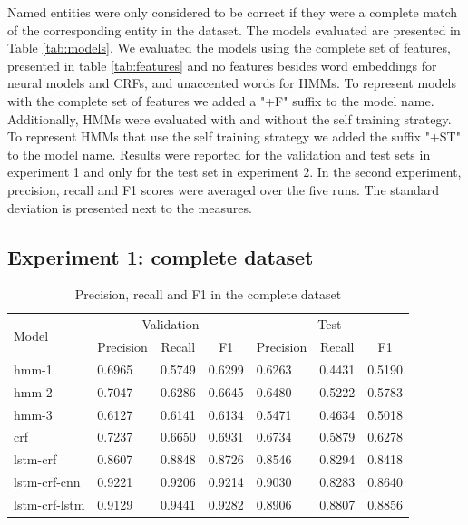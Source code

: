 \documentclass[sigconf]{acmart}
\begin{document}
Named entities were only considered to be correct if they were a complete match of the 
corresponding entity in the dataset. The models evaluated are presented in Table \ref{tab:models}.
We evaluated the models using the complete set of features, presented in 
table \ref{tab:features} and no features besides word embeddings for neural models and
CRFs, and unaccented words for HMMs. To represent models with the complete set of features
we added a "+F" suffix to the model name. Additionally, HMMs were evaluated with and
without the self training strategy. To represent HMMs that use the self training strategy
we added the suffix "+ST" to the model name.
Results were reported for the validation and test sets in experiment 1 and only for the
test set in experiment 2. In the second experiment, precision, recall and F1 scores were 
averaged over the five runs. The standard deviation is presented next to the measures.

\subsection{Experiment 1: complete dataset}

\begin{table}[h]
  \small
  \begin{center}
    \begin{tabular}{ |l|l|l|l|l|l|l| }
      \hline
      \multirow{2}{*}{Model} & \multicolumn{3}{c|}{Validation} & \multicolumn{3}{c|}{Test} \\
                             & \multicolumn{1}{c}{Precision} & \multicolumn{1}{c}{Recall} & \multicolumn{1}{c|}{F1}
                             & \multicolumn{1}{c}{Precision} & \multicolumn{1}{c}{Recall} & \multicolumn{1}{c|}{F1} \\
      \hline
      hmm-1	      & 0.6965 & 0.5749 & 0.6299 & 0.6263 & 0.4431 & 0.5190 \\
      hmm-2	      & 0.7047 & 0.6286 & 0.6645 & 0.6480 & 0.5222 & 0.5783 \\
      hmm-3	      & 0.6127 & 0.6141 & 0.6134 & 0.5471 & 0.4634 & 0.5018 \\
      crf	      & 0.7237 & 0.6650 & 0.6931 & 0.6734 & 0.5879 & 0.6278 \\
      lstm-crf        & 0.8607 & 0.8848 & 0.8726 & 0.8546 & 0.8294 & 0.8418 \\
      lstm-crf-cnn    & 0.9221 & 0.9206 & 0.9214 & 0.9030 & 0.8283 & 0.8640 \\
      lstm-crf-lstm   & 0.9129 & 0.9441 & 0.9282 & 0.8906 & 0.8807 & 0.8856 \\
      \hline
    \end{tabular}
  \end{center}
  \caption{Precision, recall and F1 in the complete dataset}
  \label{tab:experiment1}
\end{table}
\end{document}

